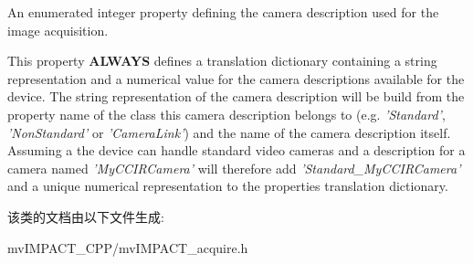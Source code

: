 An enumerated integer property defining the camera description used for the image acquisition. 

This property {\bfseries A\+L\+W\+A\+Y\+S} defines a translation dictionary containing a string representation and a numerical value for the camera descriptions available for the device. The string representation of the camera description will be build from the property name of the class this camera description belongs to (e.\+g. {\itshape 'Standard'}, {\itshape 'Non\+Standard'} or {\itshape 'Camera\+Link'}) and the name of the camera description itself. Assuming a the device can handle standard video cameras and a description for a camera named {\itshape 'My\+C\+C\+I\+R\+Camera'} will therefore add {\itshape 'Standard\+\_\+\+My\+C\+C\+I\+R\+Camera'} and a unique numerical representation to the properties translation dictionary. 

该类的文档由以下文件生成\+:\begin{DoxyCompactItemize}
\item 
mv\+I\+M\+P\+A\+C\+T\+\_\+\+C\+P\+P/mv\+I\+M\+P\+A\+C\+T\+\_\+acquire.\+h\end{DoxyCompactItemize}
